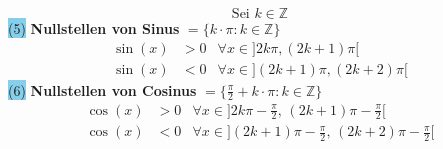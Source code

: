 \documentclass[landscape, 10pt]{article}
\begin{document}
\begin{multicols}{3}
                     \begin{equation*}
                            \text{Sei } k\in\mathbb{Z}
                     \end{equation*}
                     \colorbox{SkyBlue}{(5)}
                            \textbf{Nullstellen von Sinus} 
                            \textcolor{NavyBlue}{
                            $=\{k\cdot\pi:k\in\mathbb{Z}\}$} 
                            \begin{align*}
                                   \sin(x)&>0
                                   &\forall x\in
                                   ]2k\pi,(2k+1)\pi[\\
                                   \sin(x)&<0
                                   &\forall x\in
                                   ](2k+1)\pi,(2k+2)\pi[
                            \end{align*}
                     \colorbox{SkyBlue}{(6)} 
                            \textbf{Nullstellen von Cosinus}
                            \textcolor{NavyBlue}{
                            $=\{\frac{\pi}{2}+k\cdot\pi:
                            k\in\mathbb{Z}\}$}
                            \begin{align*}
                                   \cos(x)&>0
                                   &\forall x\in
                                   ]2k\pi-\frac{\pi}{2},\,
                                   (2k+1)\pi-\frac{\pi}{2}[\\
                                   \cos(x)&<0
                                   &\forall x\in
                                   ](2k+1)\pi-\frac{\pi}{2},\,
                                   (2k+2)\pi-\frac{\pi}{2}[
                            \end{align*}

\end{multicols}
\end{document}
